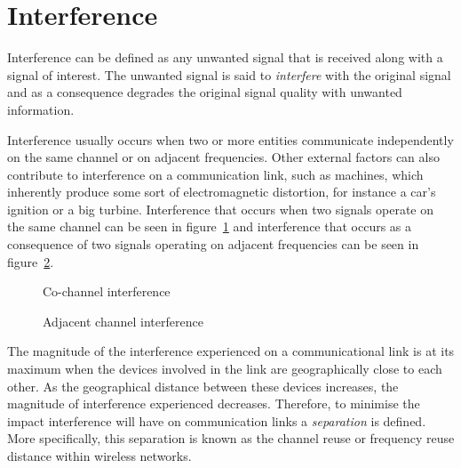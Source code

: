 \section{Interference}
\label{sec:Interference}
Interference can be defined as any unwanted signal that is received along with a signal of interest\cite{WirelessDigitalCommunications}. The unwanted signal is said to \emph{interfere} with the original signal and as a consequence degrades the original signal quality with unwanted information\cite{WirelessDigitalCommunications}.

Interference usually occurs when two or more entities communicate independently on the same channel or on adjacent frequencies\cite{WirelessCommunications,WirelessDigitalCommunications}. Other external factors can also contribute to interference on a communication link, such as machines, which inherently produce some sort of electromagnetic distortion, for instance a car's ignition or a big turbine\cite{WirelessCommunications,WirelessDigitalCommunications}. 
Interference that occurs when two signals operate on the same channel can be seen in figure~\ref{fig:sameinterference} and interference that occurs as a consequence of two signals operating on adjacent frequencies can be seen in figure~\ref{fig:adjacentinterference}.

\begin{figure}[H]
	\begin{centering}
	
	\caption{Co-channel interference}
	\label{fig:sameinterference}
	\end{centering}
\end{figure}
\begin{figure}[H]
	\begin{centering}
	
	\caption{Adjacent channel interference}
	\label{fig:adjacentinterference}
	\end{centering}
\end{figure}

The magnitude of the interference experienced on a communicational link is at its maximum when the devices involved in the link are geographically close to each other. As the geographical distance between these devices increases, the magnitude of interference experienced decreases. Therefore, to minimise the impact interference will have on communication links a \emph{separation} is defined\cite{WirelessCommunications}. More specifically, this separation is known as the channel reuse or frequency reuse distance within wireless networks\cite{WirelessCommunications}.

